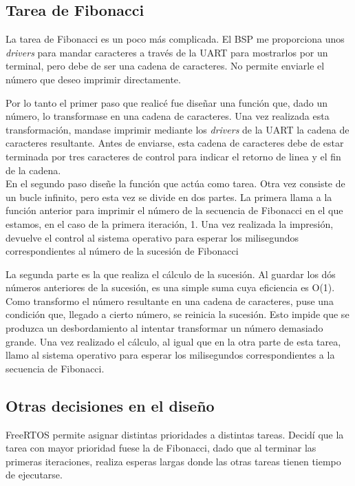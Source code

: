 \subsection{Tarea de Fibonacci}
La tarea de Fibonacci es un poco más complicada. El BSP me proporciona unos \emph{drivers} para mandar caracteres a través de la UART para mostrarlos por un terminal, pero debe de ser una cadena de caracteres. No permite enviarle el número que deseo imprimir directamente.

Por lo tanto el primer paso que realicé fue diseñar una función que, dado un número, lo transformase en una cadena de caracteres. Una vez realizada esta transformación, mandase imprimir mediante los \emph{drivers} de la UART la cadena de caracteres resultante. Antes de enviarse, esta cadena de caracteres  debe de estar terminada por tres caracteres de control para indicar el retorno de linea y el fin de la cadena.\\

En el segundo paso diseñe la función que actúa como tarea. Otra vez consiste de un bucle infinito, pero esta vez se divide en dos partes. La primera llama a la función anterior para imprimir el número de la secuencia de Fibonacci en el que estamos, en el caso de la primera iteración, 1. Una vez realizada la impresión, devuelve el control al sistema operativo para esperar los milisegundos correspondientes al número de la sucesión de Fibonacci

La segunda parte es la que realiza el cálculo de la sucesión. Al guardar los dós números anteriores de la sucesión, es una simple suma cuya eficiencia es O(1). Como transformo el número resultante en una cadena de caracteres, puse una condición que, llegado a cierto número, se reinicia la sucesión. Esto impide que se produzca un desbordamiento al intentar transformar un número demasiado grande. Una vez realizado el cálculo, al igual que en la otra parte de esta tarea, llamo al sistema operativo para esperar los milisegundos correspondientes a la secuencia de Fibonacci.

\subsection{Otras decisiones en el diseño}
FreeRTOS permite asignar distintas prioridades a distintas tareas. Decidí que la tarea con mayor prioridad fuese la de Fibonacci, dado que al terminar las primeras iteraciones, realiza esperas largas donde las otras tareas tienen tiempo de ejecutarse.

